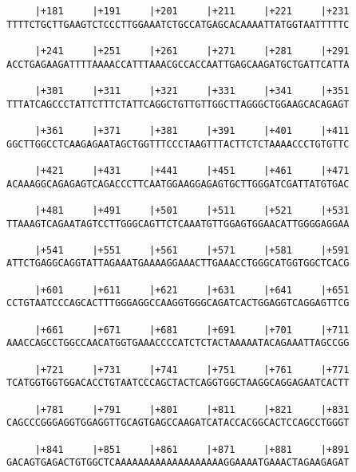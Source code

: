 \documentclass{article}
\begin{document}
\begin{Verbatim}
     |+181     |+191     |+201     |+211     |+221     |+231
TTTTCTGCTTGAAGTCTCCCTTGGAAATCTGCCATGAGCACAAAATTATGGTAATTTTTC
                                                            
     |+241     |+251     |+261     |+271     |+281     |+291
ACCTGAGAAGATTTTAAAACCATTTAAACGCCACCAATTGAGCAAGATGCTGATTCATTA
                                                            
     |+301     |+311     |+321     |+331     |+341     |+351
TTTATCAGCCCTATTCTTTCTATTCAGGCTGTTGTTGGCTTAGGGCTGGAAGCACAGAGT
                                                            
     |+361     |+371     |+381     |+391     |+401     |+411
GGCTTGGCCTCAAGAGAATAGCTGGTTTCCCTAAGTTTACTTCTCTAAAACCCTGTGTTC
                                                            
     |+421     |+431     |+441     |+451     |+461     |+471
ACAAAGGCAGAGAGTCAGACCCTTCAATGGAAGGAGAGTGCTTGGGATCGATTATGTGAC
                                                            
     |+481     |+491     |+501     |+511     |+521     |+531
TTAAAGTCAGAATAGTCCTTGGGCAGTTCTCAAATGTTGGAGTGGAACATTGGGGAGGAA
                                                            
     |+541     |+551     |+561     |+571     |+581     |+591
ATTCTGAGGCAGGTATTAGAAATGAAAAGGAAACTTGAAACCTGGGCATGGTGGCTCACG
                                                            
     |+601     |+611     |+621     |+631     |+641     |+651
CCTGTAATCCCAGCACTTTGGGAGGCCAAGGTGGGCAGATCACTGGAGGTCAGGAGTTCG
                                                            
     |+661     |+671     |+681     |+691     |+701     |+711
AAACCAGCCTGGCCAACATGGTGAAACCCCATCTCTACTAAAAATACAGAAATTAGCCGG
                                                            
     |+721     |+731     |+741     |+751     |+761     |+771
TCATGGTGGTGGACACCTGTAATCCCAGCTACTCAGGTGGCTAAGGCAGGAGAATCACTT
                                                            
     |+781     |+791     |+801     |+811     |+821     |+831
CAGCCCGGGAGGTGGAGGTTGCAGTGAGCCAAGATCATACCACGGCACTCCAGCCTGGGT
                                                            
     |+841     |+851     |+861     |+871     |+881     |+891
GACAGTGAGACTGTGGCTCAAAAAAAAAAAAAAAAAAAGGAAAATGAAACTAGAAGAGAT
                                                            

\end{Verbatim}
\end{document}
